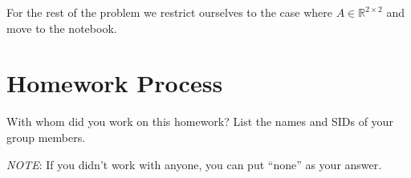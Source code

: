 \documentclass[10pt]{article}
\theoremstyle{definition}
\theoremstyle{plain}
\newcommand{\RR}{\mathbb{R}}
\begin{document}
For the rest of the problem we restrict ourselves to the case where $A \in \RR^{2 \times 2}$ and move to the notebook.

\section{Homework Process}

With whom did you work on this homework? List the names and SIDs of your group members.

\textit{NOTE}: If you didn't work with anyone, you can put ``none'' as your answer.
\end{document}
